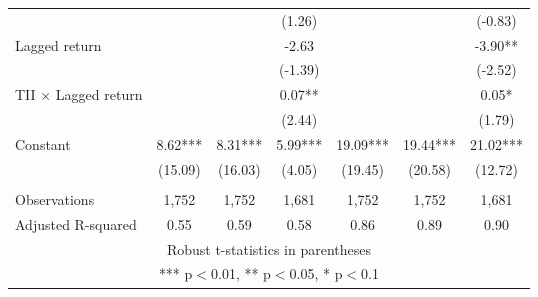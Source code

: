 \documentclass[]{article}
\begin{document}
\begin{tabular}{lcccccc}
 &  &  & (1.26) &  &  & (-0.83) \\
Lagged return &  &  & -2.63 &  &  & -3.90** \\
 &  &  & (-1.39) &  &  & (-2.52) \\
TII $\times$ Lagged return &  &  & 0.07** &  &  & 0.05* \\
 &  &  & (2.44) &  &  & (1.79) \\
Constant & 8.62*** & 8.31*** & 5.99*** & 19.09*** & 19.44*** & 21.02*** \\
 & (15.09) & (16.03) & (4.05) & (19.45) & (20.58) & (12.72) \\
 &  &  &  &  &  &  \\
Observations & 1,752 & 1,752 & 1,681 & 1,752 & 1,752 & 1,681 \\
 Adjusted R-squared & 0.55 & 0.59 & 0.58 & 0.86 & 0.89 & 0.90 \\ \hline
\multicolumn{7}{c}{ Robust t-statistics in parentheses} \\
\multicolumn{7}{c}{ *** p$<$0.01, ** p$<$0.05, * p$<$0.1} \\
\end{tabular}
\end{document}
